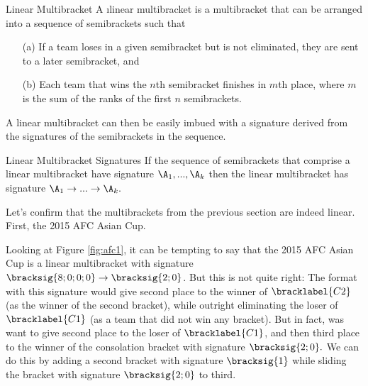 {    %
   
    \begin{definition}{Linear Multibracket}{}
        A \i{linear multibracket} is a multibracket that can be arranged into a sequence of semibrackets such that
        \begin{enumerate}
            \item[(a)] If a team loses in a given semibracket but is not eliminated, they are sent to a later semibracket, and
            \item[(b)] Each team that wins the $n$th semibracket finishes in $m$th place, where $m$ is the sum of the ranks of the first $n$ semibrackets.
        \end{enumerate}
    \end{definition}

    A linear multibracket can then be easily imbued with a signature derived from the signatures of the semibrackets in the sequence.

    \begin{definition}{Linear Multibracket Signatures}{}
        If the sequence of semibrackets that comprise a linear multibracket have signature $\A_1, ..., \A_k$ then the linear multibracket has signature $\A_1 \to ... \to \A_k.$
    \end{definition}

    Let's confirm that the multibrackets from the previous section are indeed linear. First, the 2015 AFC Asian Cup.


    Looking at Figure \ref{fig:afc1}, it can be tempting to say that the 2015 AFC Asian Cup is a linear multibracket with signature $\bracksig{8;0;0;0} \to \bracksig{2;0}$. But this is not quite right: The format with this signature would give second place to the winner of $\bracklabel{C2}$ (as the winner of the second bracket), while outright eliminating the loser of $\bracklabel{C1}$ (as a team that did not win any bracket). But in fact, was want to give second place to the loser of $\bracklabel{C1}$, and then third place to the winner of the consolation bracket with signature $\bracksig{2;0}.$ We can do this by adding a second bracket with signature $\bracksig{1}$ while sliding the bracket with signature $\bracksig{2;0}$ to third.

}
